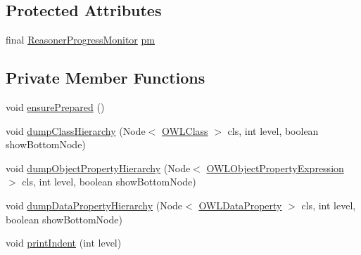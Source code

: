 \subsection*{Protected Attributes}
\begin{DoxyCompactItemize}
\item 
final \hyperlink{interfaceorg_1_1semanticweb_1_1owlapi_1_1reasoner_1_1_reasoner_progress_monitor}{Reasoner\-Progress\-Monitor} \hyperlink{classorg_1_1semanticweb_1_1owlapi_1_1reasoner_1_1structural_1_1_structural_reasoner_ab884badc7147df6e68442fa8e12d6e3c}{pm}
\end{DoxyCompactItemize}
\subsection*{Private Member Functions}
\begin{DoxyCompactItemize}
\item 
void \hyperlink{classorg_1_1semanticweb_1_1owlapi_1_1reasoner_1_1structural_1_1_structural_reasoner_a428ae0ce54ba715b7d9952252b6bec99}{ensure\-Prepared} ()
\item 
void \hyperlink{classorg_1_1semanticweb_1_1owlapi_1_1reasoner_1_1structural_1_1_structural_reasoner_a30893d5a6f4612f5da2b51334901c1b9}{dump\-Class\-Hierarchy} (Node$<$ \hyperlink{interfaceorg_1_1semanticweb_1_1owlapi_1_1model_1_1_o_w_l_class}{O\-W\-L\-Class} $>$ cls, int level, boolean show\-Bottom\-Node)
\item 
void \hyperlink{classorg_1_1semanticweb_1_1owlapi_1_1reasoner_1_1structural_1_1_structural_reasoner_a027b2aeef6cd5b8adb672ee26ac000c7}{dump\-Object\-Property\-Hierarchy} (Node$<$ \hyperlink{interfaceorg_1_1semanticweb_1_1owlapi_1_1model_1_1_o_w_l_object_property_expression}{O\-W\-L\-Object\-Property\-Expression} $>$ cls, int level, boolean show\-Bottom\-Node)
\item 
void \hyperlink{classorg_1_1semanticweb_1_1owlapi_1_1reasoner_1_1structural_1_1_structural_reasoner_a6e65ff9b611765c739d80ab3d9a40133}{dump\-Data\-Property\-Hierarchy} (Node$<$ \hyperlink{interfaceorg_1_1semanticweb_1_1owlapi_1_1model_1_1_o_w_l_data_property}{O\-W\-L\-Data\-Property} $>$ cls, int level, boolean show\-Bottom\-Node)
\item 
void \hyperlink{classorg_1_1semanticweb_1_1owlapi_1_1reasoner_1_1structural_1_1_structural_reasoner_a8dbc1318a62228a63da01ecb07f63e97}{print\-Indent} (int level)
\end{DoxyCompactItemize}
